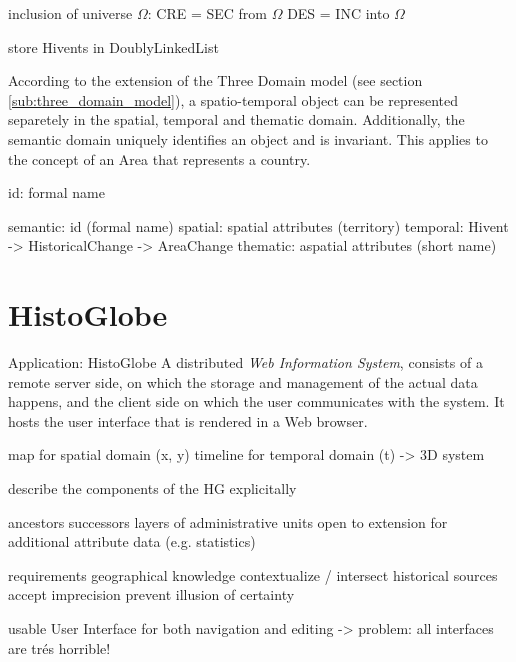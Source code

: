 inclusion of universe $\Omega$:
CRE = SEC from $\Omega$
DES = INC into $\Omega$





store Hivents in DoublyLinkedList


\label{sub:four_domain_model}

According to the extension of the Three Domain model (see section \ref{sub:three_domain_model}), a spatio-temporal object can be represented separetely in the spatial, temporal and thematic domain. Additionally, the semantic domain uniquely identifies an object and is invariant. This applies to the concept of an Area that represents a country.


id: formal name

semantic: id (formal name)
spatial:  spatial attributes (territory)
temporal: Hivent -> HistoricalChange -> AreaChange
thematic: aspatial attributes (short name)


\section{HistoGlobe} %
\label{sec:histoglobe}

Application: HistoGlobe
A distributed \emph{Web Information System}, consists of a remote server side, on which the storage and management of the actual data happens, and the client side on which the user communicates with the system. It hosts the user interface that is rendered in a Web browser.

map for spatial domain (x, y)
timeline for temporal domain (t)
-> 3D system

describe the components of the HG explicitally

ancestors successors
layers of administrative units
open to extension for additional attribute data (e.g. statistics)

requirements
  geographical knowledge
  contextualize / intersect historical sources
  accept imprecision
  prevent illusion of certainty

usable User Interface for both navigation and editing
-> problem: all interfaces are trés horrible!



